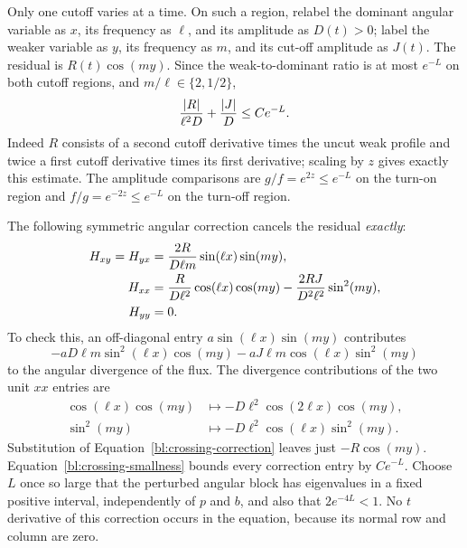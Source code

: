 Only one cutoff varies at a time.  On such a region, relabel the
dominant angular variable as $x$, its frequency as $\ell$, and its
amplitude as $D(t)>0$; label the weaker variable as $y$, its frequency
as $m$, and its cut-off amplitude as $J(t)$.  The residual is
$R(t)\cos(my)$.  Since the weak-to-dominant ratio is at most $e^{-L}$
on both cutoff regions, and $m/\ell\in\{2,1/2\}$,
\begin{equation}\label{bl:crossing-smallness}
 \frac{\left\lvert R\right\rvert}{\ell^2D}+\frac{\left\lvert J\right\rvert}{D}\le C e^{-L}.
\end{equation}
Indeed $R$ consists of a second cutoff derivative times the uncut weak
profile and twice a first cutoff derivative times its first derivative;
scaling by $z$ gives exactly this estimate.  The amplitude comparisons
are $g/f=e^{2z}\le e^{-L}$ on the turn-on region and
$f/g=e^{-2z}\le e^{-L}$ on the turn-off region.

The following symmetric angular correction cancels the residual
\emph{exactly}:
\begin{align}
 H_{xy}=H_{yx}&=\frac{2R}{D\ell m}\sin(\ell x)\sin(my),\notag\\
 H_{xx}&=\frac{R}{D\ell^2}\cos(\ell x)\cos(my)
            -\frac{2RJ}{D^2\ell^2}\sin^2(my),\notag\\
 H_{yy}&=0.\label{bl:crossing-correction}
\end{align}
To check this, an off-diagonal entry
$a\sin(\ell x)\sin(my)$ contributes
\[
 -aD\ell m\sin^2(\ell x)\cos(my)
 -aJ\ell m\cos(\ell x)\sin^2(my)
\]
to the angular divergence of the flux.  The divergence contributions
of the two unit $xx$ entries are
\begin{align*}
 \cos(\ell x)\cos(my)&\longmapsto
       -D\ell^2\cos(2\ell x)\cos(my),\\
 \sin^2(my)&\longmapsto
       -D\ell^2\cos(\ell x)\sin^2(my).
\end{align*}
Substitution of Equation~\eqref{bl:crossing-correction} leaves just
$-R\cos(my)$.  Equation~\eqref{bl:crossing-smallness} bounds every
correction entry by $C e^{-L}$.  Choose $L$ once so large that the perturbed
angular block has eigenvalues in a fixed positive interval, independently
of $p$ and $b$, and also that $2e^{-4L}<1$.  No $t$ derivative of this
correction occurs in the equation, because its normal row and column
are zero.

